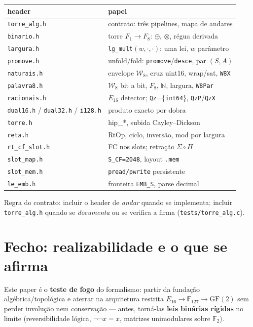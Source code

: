 \documentclass[11pt,a4paper]{article}
\newcommand{\code}[1]{\texttt{\small #1}}
\newcommand{\Word}{\mathcal{W}}
\begin{document}
\begin{center}\small
\begin{tabular}{@{}ll@{}}
\toprule
header & papel \\
\midrule
\code{torre\_alg.h} & contrato: três pipelines, mapa de andares \\
\code{binario.h} & torre $F_1\to F_8$: $\oplus$, $\otimes$, régua derivada \\
\code{largura.h} & \code{lg\_mult}$(w,\cdot,\cdot)$: uma lei, $w$ parâmetro \\
\code{promove.h} & unfold/fold: \code{promove}/\code{desce}, par $(S,A)$ \\
\code{naturais.h} & envelope $\Word_8$, cruz uint16, wrap/sat, \code{W8X} \\
\code{palavra8.h} & $\Word_8$ bit a bit, $F_8$, $\mathbb{N}$, largura, \code{W8Par} \\
\code{racionais.h} & $E_{16}$ detector; \code{Qz}=\{\code{int64}\}, \code{QzP}/\code{QzX} \\
\code{dual16.h} / \code{dual32.h} / \code{i128.h} & produto exacto por dobra \\
\code{torre.h} & hip\_*, subida Cayley--Dickson \\
\code{reta.h} & RtOp, ciclo, inversão, mod por largura \\
\code{rt\_cf\_slot.h} & FC nos slots; retração $\Sigma\circ\Pi$ \\
\code{slot\_map.h} & \code{S\_CF=2048}, layout \code{.mem} \\
\code{slot\_mem.h} & \code{pread/pwrite} persistente \\
\code{le\_emb.h} & fronteira \code{EMB\_S}, parse decimal \\
\bottomrule
\end{tabular}
\end{center}

\noindent Regra do contrato: incluir o header de \emph{andar} quando se
implementa; incluir \code{torre\_alg.h} quando se \emph{documenta} ou se verifica
a firma (\code{tests/torre\_alg.c}).

\section{Fecho: realizabilidade e o que se afirma}\label{sec:fecho}

\noindent Este paper é o \textbf{teste de fogo} do formalismo: partir da
fundação algébrica/topológica e aterrar na arquitetura restrita
$E_{16}\to\mathbb{F}_{127}\to\mathrm{GF}(2)$ sem perder involução nem
conservação --- antes, torná-las \textbf{leis binárias rígidas} no limite
(reversibilidade lógica, $\neg\neg x=x$, matrizes unimodulares sobre
$\mathbb{F}_2$).
\end{document}

